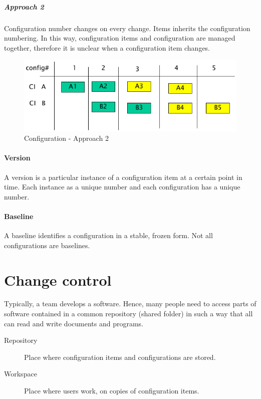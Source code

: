 \subparagraph{Approach 2}
Configuration number changes on every change. Items inherits the configuration numbering. In this way, configuration items and configuration are managed together, therefore it is unclear when a configuration item changes.

\begin{figure}[hbtp]
\centering
\includegraphics[scale=0.3]{images/configuration_approach2.png}
\caption{Configuration - Approach 2}
\end{figure}

\paragraph{Version}
A version is a particular instance of a configuration item at a certain point in time. Each instance as a unique number and each configuration has a unique number.

\paragraph{Baseline}
A baseline identifies a configuration in a stable, frozen form. Not all configurations are baselines.

\section{Change control}
Typically, a team develops a software. Hence, many people need to access parts of software contained in a common repository (shared folder) in such a way that all can read and write documents and programs.

\begin{description}
\item [Repository] Place where configuration items and configurations are stored.
\item [Workspace] Place where users work, on copies of configuration items.
\end{description}

